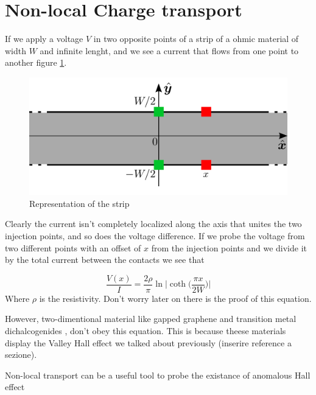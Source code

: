 \section{Non-local Charge transport}
If we apply a voltage $V$ in two opposite points of a strip of a ohmic material of width $W$ and infinite lenght, and  we see a current that flows from one point to another figure \ref{fig:beconcini_strip}.\newline
\begin{figure}
    \centering
    \includegraphics[width=0.7\linewidth]{Immagini/ValleyHall/beconcini_strip.pdf}
    \caption{Representation of the strip}
    \label{fig:beconcini_strip}
\end{figure}
Clearly the current isn't completely localized along the axis that unites the two injection points, and so does the voltage difference.\newline
If we probe the voltage from two different points with an offset of $x$ from the injection points and we divide it by the total current between the contacts we see that  

\begin{equation}
    \frac{V(x)}I=\frac{2\rho}\pi\ln\bigg |\coth \Big(\frac{\pi x}{2W}\Big)\bigg |
    \label{eq:ohmic signal}
\end{equation}
Where $\rho$ is the resistivity. Don't worry later on there is the proof of this equation.\newline

However, two-dimentional material like gapped graphene \cite{gorbachev2014detecting,sui2015gate,shimazaki2015generation} and transition metal dichalcogenides \cite{xiao2012coupled,mak2014valley,lee2017valley}, don't obey this equation. This is because theese materials display the Valley Hall effect we talked about previously (inserire reference a sezione).

Non-local transport can be a useful tool to probe the existance of anomalous Hall effect \cite{valenzuela2006direct,abanin2009nonlocal,brune2010evidence,abanin2011giant,balakrishnan2013g,wang2015proximity}


